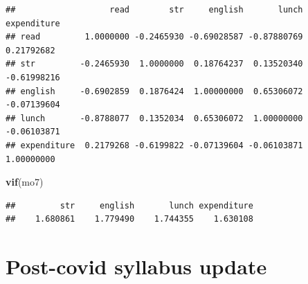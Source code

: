 \documentclass[
]{book}
\newenvironment{Shaded}{\begin{snugshade}}{\end{snugshade}}
\newcommand{\KeywordTok}[1]{\textcolor[rgb]{0.13,0.29,0.53}{\textbf{#1}}}
\newcommand{\NormalTok}[1]{#1}
\begin{document}
\begin{verbatim}
##                   read        str     english       lunch expenditure
## read         1.0000000 -0.2465930 -0.69028587 -0.87880769  0.21792682
## str         -0.2465930  1.0000000  0.18764237  0.13520340 -0.61998216
## english     -0.6902859  0.1876424  1.00000000  0.65306072 -0.07139604
## lunch       -0.8788077  0.1352034  0.65306072  1.00000000 -0.06103871
## expenditure  0.2179268 -0.6199822 -0.07139604 -0.06103871  1.00000000
\end{verbatim}

\begin{Shaded}
\begin{Highlighting}[]
\KeywordTok{vif}\NormalTok{(mo7)}
\end{Highlighting}
\end{Shaded}

\begin{verbatim}
##         str     english       lunch expenditure 
##    1.680861    1.779490    1.744355    1.630108
\end{verbatim}

\hypertarget{post-covid-syllabus-update}{%
\chapter{Post-covid syllabus update}\label{post-covid-syllabus-update}}
\end{document}
